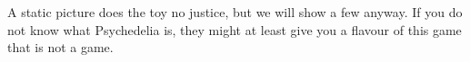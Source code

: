 A static picture does the toy no justice, but we will show a few anyway. If you do not know what Psychedelia is, they
might at least give you a flavour of this game that is not a game. 
\begin{figure}[H]
    \begin{adjustbox}{width=10cm,center}
      \hspace{0.1cm}
    \end{adjustbox}
\end{figure}
\vspace{-0.8cm}
